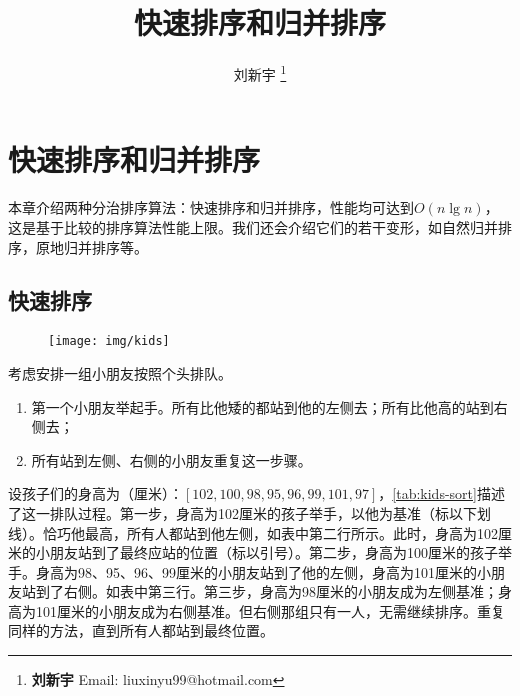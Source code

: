 \documentclass[b5paper]{ctexart}
\begin{document}
\title{快速排序和归并排序}

\author{刘新宇
\thanks{{\bfseries 刘新宇 } \newline
  Email: liuxinyu99@hotmail.com \newline}
  }

\maketitle
\fi


\ifx\wholebook\relax
\chapter{快速排序和归并排序}
\fi

本章介绍两种分治排序算法：快速排序和归并排序，性能均可达到$O(n \lg n)$，这是基于比较的排序算法性能上限\cite{TAOCP}。我们还会介绍它们的若干变形，如自然归并排序，原地归并排序等。

\section{快速排序}

\begin{figure}[htbp]
 \centering
 \texttt{[image: img/kids]}
 \captionsetup{labelformat=empty}
 \label{fig:kids-sort}
\end{figure}

考虑安排一组小朋友按照个头排队。

\begin{enumerate}
  \item 第一个小朋友举起手。所有比他矮的都站到他的左侧去；所有比他高的站到右侧去；
  \item 所有站到左侧、右侧的小朋友重复这一步骤。
\end{enumerate}

设孩子们的身高为（厘米）：$[102, 100, 98, 95, 96, 99, 101, 97]$，\cref{tab:kids-sort}描述了这一排队过程。第一步，身高为102厘米的孩子举手，以他为基准（标以下划线）。恰巧他最高，所有人都站到他左侧，如表中第二行所示。此时，身高为102厘米的小朋友站到了最终应站的位置（标以引号）。第二步，身高为100厘米的孩子举手。身高为98、95、96、99厘米的小朋友站到了他的左侧，身高为101厘米的小朋友站到了右侧。如表中第三行。第三步，身高为98厘米的小朋友成为左侧基准；身高为101厘米的小朋友成为右侧基准。但右侧那组只有一人，无需继续排序。重复同样的方法，直到所有人都站到最终位置。
\end{document}
